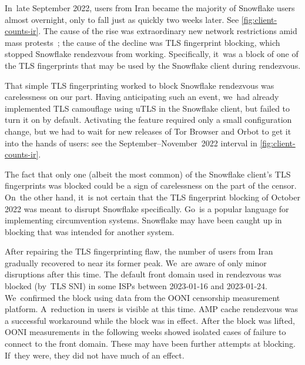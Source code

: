 \documentclass[letterpaper,twocolumn]{article}
\begin{document}
In~late September 2022,
users from Iran became the majority of Snowflake users almost overnight,
only to fall just as quickly two weeks later.
See \autoref{fig:client-counts-ir}.
The cause of the rise was
extraordinary new network restrictions amid mass protests~\cite{ooni-2022-iran-blocks-social-media-mahsa-amini-protests};
the cause of the decline was TLS fingerprint blocking,
which stopped Snowflake rendezvous from working.
Specifically, it~was a block of one of the TLS fingerprints
that may be used by the Snowflake client during rendezvous.

That simple TLS fingerprinting worked to block Snowflake rendezvous
was carelessness on our part.
Having anticipating such an event,
we~had already implemented TLS camouflage using uTLS
in the Snowflake client,
but failed to turn it on by default.
Activating the feature required only a small configuration change,
but we had to wait for new releases of Tor Browser and Orbot
to get it into the hands of users:
see the September--November~2022 interval in \autoref{fig:client-counts-ir}.

The fact that only one (albeit the most common)
of the Snowflake client's TLS fingerprints was blocked
could be a sign of carelessness on the part of the censor.
On~the other hand, it~is not certain that the TLS fingerprint blocking of October 2022
was meant to disrupt Snowflake specifically.
Go~is a popular language for implementing circumvention systems.
Snowflake may have been caught up in blocking that was intended for another system.


After repairing the TLS fingerprinting flaw,
the number of users from Iran gradually recovered
to near its former peak.
We~are aware of only minor disruptions after this time.
The default front domain used in rendezvous
was blocked (by~TLS SNI) in some ISPs
between \mbox{2023-01-16} and \mbox{2023-01-24}.
We~confirmed the block using data from the OONI
censorship measurement platform.
A~reduction in users is visible at this time.
AMP cache rendezvous was a successful workaround while the block was in effect.
After the block was lifted,
OONI measurements in the following weeks showed isolated cases
of failure to connect to the front domain.
These may have been further attempts at blocking.
If~they were, they did not have much of an effect.
\end{document}
